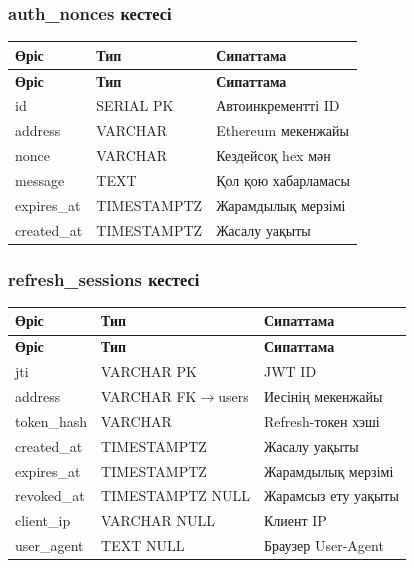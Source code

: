 \documentclass[14pt,a4paper]{extarticle}
\begin{document}
\subsubsection{auth\_nonces кестесі}
\begin{longtable}{|p{3.2cm}|p{3.4cm}|p{7.8cm}|}
\hline\textbf{Өріс} & \textbf{Тип} & \textbf{Сипаттама}\\\hline\endfirsthead\hline\textbf{Өріс} & \textbf{Тип} & \textbf{Сипаттама}\\\hline\endhead
id & SERIAL PK & Автоинкрементті ID\\\hline
address & VARCHAR & Ethereum мекенжайы\\\hline
nonce & VARCHAR & Кездейсоқ hex мән\\\hline
message & TEXT & Қол қою хабарламасы\\\hline
expires\_at & TIMESTAMPTZ & Жарамдылық мерзімі\\\hline
created\_at & TIMESTAMPTZ & Жасалу уақыты\\\hline
\end{longtable}

\subsubsection{refresh\_sessions кестесі}
\begin{longtable}{|p{3.2cm}|p{3.7cm}|p{7.5cm}|}
\hline\textbf{Өріс} & \textbf{Тип} & \textbf{Сипаттама}\\\hline\endfirsthead\hline\textbf{Өріс} & \textbf{Тип} & \textbf{Сипаттама}\\\hline\endhead
jti & VARCHAR PK & JWT ID\\\hline
address & VARCHAR FK$\to$users & Иесінің мекенжайы\\\hline
token\_hash & VARCHAR & Refresh-токен хэші\\\hline
created\_at & TIMESTAMPTZ & Жасалу уақыты\\\hline
expires\_at & TIMESTAMPTZ & Жарамдылық мерзімі\\\hline
revoked\_at & TIMESTAMPTZ NULL & Жарамсыз ету уақыты\\\hline
client\_ip & VARCHAR NULL & Клиент IP\\\hline
user\_agent & TEXT NULL & Браузер User-Agent\\\hline
\end{longtable}
\end{document}
